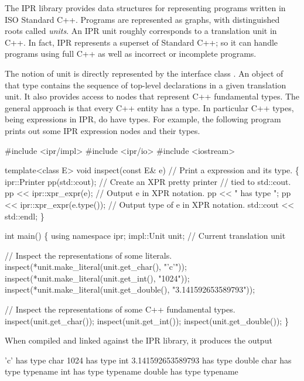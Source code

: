 \documentclass[11pt]{article}
\begin{document}
The IPR library provides data structures for representing programs written in
ISO Standard C++.  Programs are represented as graphs, with distinguished
roots called \emph{units}.  An IPR unit roughly corresponds to a translation
unit in C++.  In fact, IPR represents a superset of Standard C++; so it can
handle programs using full C++  as well as incorrect or incomplete programs. 

The notion of unit is directly represented by the interface class
. An object of that type contains the sequence of top-level
declarations in a given translation unit. It also provides  access to nodes
that represent C++ fundamental types.  The general approach is that
every C++ entity has a type.  In particular C++ types, being expressions in
IPR, do have types.  For example, the following program prints out some
IPR expression nodes and their types.
\begin{Program}
#include <ipr/impl>
#include <ipr/io>
#include <iostream>

template<class E>
void inspect(const E& e)        // Print a expression and its type.
\{
   ipr::Printer pp(std::cout);  // Create an XPR pretty printer
                                // tied to std::cout.
   pp << ipr::xpr_expr(e);      // Output e in XPR notation.
   pp << " has type ";
   pp << ipr::xpr_expr(e.type()); // Output type of e in XPR notation.
   std::cout << std::endl;
\}

int main()
\{
   using namespace ipr;
   impl::Unit unit;             // Current translation unit

   // Inspect the representations of some literals.
   inspect(*unit.make_literal(unit.get_char(), "'c'"));
   inspect(*unit.make_literal(unit.get_int(), "1024"));
   inspect(*unit.make_literal(unit.get_double(), "3.141592653589793"));

   // Inspect the representations of some C++ fundamental types.
   inspect(unit.get_char());
   inspect(unit.get_int());
   inspect(unit.get_double());
\}
\end{Program}

When compiled and linked against the IPR library, it produces the output
\begin{Output}
'c' has type char
1024 has type int
3.141592653589793 has type double
char has type  typename
int has type  typename
double has type  typename
\end{Output}

\end{document}
